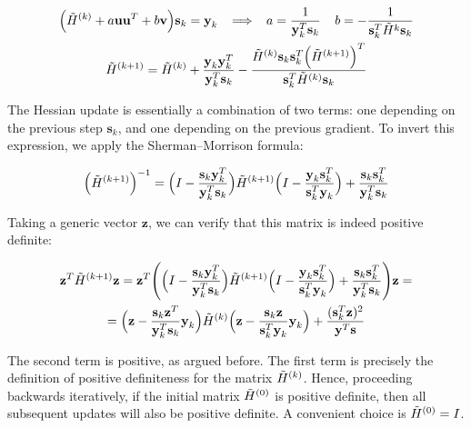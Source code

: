 \documentclass{article}
\numberwithin{equation}{subsection}
\begin{document}
\begin{gather*}
    \Big(\Tilde{H}^{(k)} + a \textbf{u}\textbf{u}^T + b \textbf{v}\Big) \textbf{s}_k = \textbf{y}_k \;\; \implies \;\; a = \frac{1}{\textbf{y}_k^T \textbf{s}_k } \;\;\;\; b = -\frac{1}{\textbf{s}_k^T \Tilde{H}^k \textbf{s}_k} \\
    \Tilde{H}^{(k+1)} = \Tilde{H}^{(k)} + \frac{\textbf{y}_k \textbf{y}_k^T}{\textbf{y}_k^T \textbf{s}_k} - \frac{\Tilde{H}^{(k)}\textbf{s}_k \textbf{s}_k^T \Big(\Tilde{H}^{(k+1)}\Big)^T}{\textbf{s}_k^T \Tilde{H}^{(k)}\textbf{s}_k}
\end{gather*}

The Hessian update is essentially a combination of two terms: one depending on the previous step $\textbf{s}_k$, and one depending on the previous gradient. To invert this expression, we apply the Sherman–Morrison formula:

\begin{equation}
    \Big(\Tilde{H}^{(k+1)}\Big)^{-1} = \Big( I - \frac{\textbf{s}_k\textbf{y}_k^T}{\textbf{y}_k^T\textbf{s}_k} \Big) \Tilde{H}^{(k+1)} \Big( I - \frac{\textbf{y}_k \textbf{s}_k^T}{\textbf{s}_k^T \textbf{y}_k} \Big) + \frac{\textbf{s}_k \textbf{s}_k^T}{\textbf{y}_k^T \textbf{s}_k}
\end{equation}

Taking a generic vector $\textbf{z}$, we can verify that this matrix is indeed positive definite:

\begin{gather*}
    \textbf{z}^T \Tilde{H}^{(k+1)} \textbf{z} = \textbf{z}^T \Bigg( \Big( I - \frac{\textbf{s}_k\textbf{y}_k^T}{\textbf{y}_k^T\textbf{s}_k} \Big) \Tilde{H}^{(k+1)} \Big( I - \frac{\textbf{y}_k \textbf{s}_k^T}{\textbf{s}_k^T \textbf{y}_k} \Big) + \frac{\textbf{s}_k \textbf{s}_k^T}{\textbf{y}_k^T \textbf{s}_k} \Bigg) \textbf{z} = \\
    = \Big( \textbf{z} - \frac{\textbf{s}_k\textbf{z}^T}{\textbf{y}_k^T\textbf{s}_k} \textbf{y}_k \Big) \Tilde{H}^{(k)} \Big( \textbf{z} - \frac{\textbf{s}_k \textbf{z}}{\textbf{s}_k^T \textbf{y}_k} \textbf{y}_k \Big) + \frac{(\textbf{s}_k^T \textbf{z})^2}{\textbf{y}^T \textbf{s}}
\end{gather*}

The second term is positive, as argued before. The first term is precisely the definition of positive definiteness for the matrix $\Tilde{H}^{(k)}$. Hence, proceeding backwards iteratively, if the initial matrix $\Tilde{H}^{(0)}$ is positive definite, then all subsequent updates will also be positive definite.
A convenient choice is $\Tilde{H}^{(0)} = I$.
\end{document}
